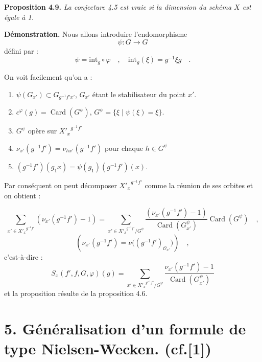 \documentclass[11pt]{article}
\begin{document}
\medskip
\noindent
\textbf{Proposition 4.9.} \emph{La conjecture 4.5 est vraie si la dimension du schéma $X$ est égale à 1.}

\medskip

\noindent
\textbf{Démonstration.} Nous allons introduire l'endomorphisme
\[
\psi : G \longrightarrow G
\]
défini par :
\[
\psi = \mathrm{int}_g \circ \varphi \quad , \quad \mathrm{int}_g(\xi) = g^{-1}\xi g \quad .
\]

On voit facilement qu'on a :
\begin{enumerate}
\item[i)] $\psi(G_{x'}) \subset G_{g^{-1}f'x'}$, $G_{x'}$ étant le stabilisateur du point $x'$.
\item[ii)] $c^\varphi(g) = \operatorname{Card}(G^\psi)$, $G^\psi = \{ \xi \mid \psi(\xi) = \xi \}$.
\item[iii)] $G^\psi$ opère sur ${X'_x}^{g^{-1}f'}$
\item[iv)] $\nu_{x'}(g^{-1}f') = \nu_{hx'}(g^{-1}f')$ pour chaque $h \in G^\psi$
\item[v)] $(g^{-1}f')(g_1x) = \psi(g_1)(g^{-1}f')(x)$.
\end{enumerate}

Par conséquent on peut décomposer ${X'_x}^{g^{-1}f'}$ comme la réunion de ses orbites et on obtient :

\begin{equation}\tag{4.9.1}
\sum_{x' \in {X'_x}^{g^{-1}f'}} (\nu_{x'}(g^{-1}f') - 1) = \sum_{x' \in {X'_x}^{g^{-1}f'}/G^\psi} \frac{(\nu_{x'}(g^{-1}f') - 1)}{\operatorname{Card}(G^\psi_{x'})} \operatorname{Card}(G^\psi) \quad ,
\end{equation}
\[
(\nu_{x'}(g^{-1}f')=\nu\bigl((g^{-1}f')_{\mathcal{O}_{x'}}\bigr)) \quad ,
\]
c'est-à-dire :
\begin{equation}\tag{4.9.2}
S_x(f',f,G,\varphi)(g)=\sum_{x' \in {X'_x}^{g^{-1}f'}/G^\psi}
\frac{\nu_{x'}(g^{-1}f')-1}{\operatorname{Card}(G^\psi_{x'})}
\end{equation}
et la proposition résulte de la proposition 4.6.


\section*{5. Généralisation d'un formule de type Nielsen-Wecken. {\normalfont (cf.[1])}}
\end{document}
